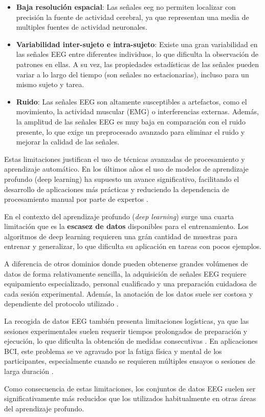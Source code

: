 \begin{itemize}
    \item \textbf{Baja resolución espacial}: Las señales \acrshort{eeg} no permiten localizar con precisión la fuente de actividad cerebral, ya que representan una media de multiples fuentes de actividad neuronales.

    \item \textbf{Variabilidad inter-sujeto e intra-sujeto}: Existe una gran variabilidad en las señales EEG entre diferentes individuos, lo que dificulta la observación de patrones en ellas. A su vez, las propiedades estadísticas de las señales pueden variar a lo largo del tiempo (son señales no estacionarias), incluso para un mismo sujeto y tarea.

    \item \textbf{Ruido}: Las señales EEG son altamente susceptibles a artefactos, como el movimiento, la actividad muscular (EMG) o interferencias externas. Además, la amplitud de las señales EEG es muy baja en comparación con el ruido presente, lo que exige un preprocesado avanzado para eliminar el ruido y mejorar la calidad de las señales.

\end{itemize}

Estas limitaciones justifican el uso de técnicas avanzadas de procesamiento y aprendizaje automático. En los últimos años el uso de modelos de aprendizaje profundo (deep learning) ha supuesto un avance significativo, facilitando el desarrollo de aplicaciones más prácticas y reduciendo la dependencia de procesamiento manual por parte de expertos \cite{craik_DeepLearning2019}.

En el contexto del aprendizaje profundo (\textit{deep learning}) surge una cuarta limitación que es la \textbf{escasez de datos} disponibles para el entrenamiento. Los algoritmos de deep learning requieren una grán cantidad de muestras para entrenar y generalizar, lo que dificulta su aplicación en tareas con pocos ejemplos.

A diferencia de otros dominios donde pueden obtenerse grandes volúmenes de datos de forma relativamente sencilla, la adquisición de señales EEG requiere equipamiento especializado, personal cualificado y una preparación cuidadosa de cada sesión experimental. Además, la anotación de los datos suele ser costosa y dependiente del protocolo utilizado \cite{tan_DeepTransfer2018}.

La recogida de datos EEG también presenta limitaciones logísticas, ya que las sesiones experimentales suelen requerir tiempos prolongados de preparación y ejecución, lo que dificulta la obtención de medidas consecutivas \cite{sugden_RemoteCollection2023}. En aplicaciones BCI, este problema se ve agravado por la fatiga física y mental de los participantes, especialmente cuando se requieren múltiples ensayos o sesiones de larga duración \cite{rommel_DataAugmentation2022}.

Como consecuencia de estas limitaciones, los conjuntos de datos EEG suelen ser significativamente más reducidos que los utilizados habitualmente en otras áreas del aprendizaje profundo.

